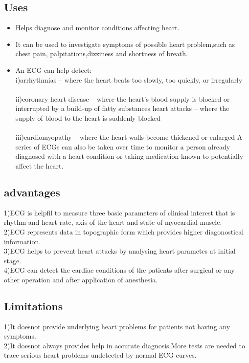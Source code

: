 \documentclass[12pt]{article}
\begin{document}
\subsection{Uses}
\begin{itemize}
\item Helps diagnose and monitor conditions affecting heart.\\\item It can be used to investigate symptoms of possible heart problem,such as chest pain, palpitations,dizziness and shortness of breath.\\
\item 
An ECG can help detect:\\
i)arrhythmias – where the heart beats too slowly, too quickly, or irregularly\\
\\
ii)coronary heart disease – where the heart's blood supply is blocked or interrupted by a build-up of fatty substances
heart attacks – where the supply of blood to the heart is suddenly blocked\\
\\
iii)cardiomyopathy – where the heart walls become thickened or enlarged
A series of ECGs can also be taken over time to monitor a person already diagnosed with a heart condition or taking medication known to potentially affect the heart.
\end{itemize}
\subsection{advantages}
1)ECG is helpfil to measure three basic parameters of clinical interest that is rhythm and heart rate, axis of the heart and state of myocardial muscle.\\2)ECG represents data in topographic form which provides higher diagonostical information.\\3)ECG helps to prevent heart attacks by analysing heart parametes at initial stage.\\4)ECG can detect the cardiac conditions of the patients after surgical or any other operation and after application of anesthesia.
\subsection{Limitations}
1)It doesnot provide underlying heart problems for patients not having any symptoms.\\2)It doesnot always provides help in accurate diagnosis.More tests are needed to trace serious heart problems undetected by normal ECG curves.
\end{document}
